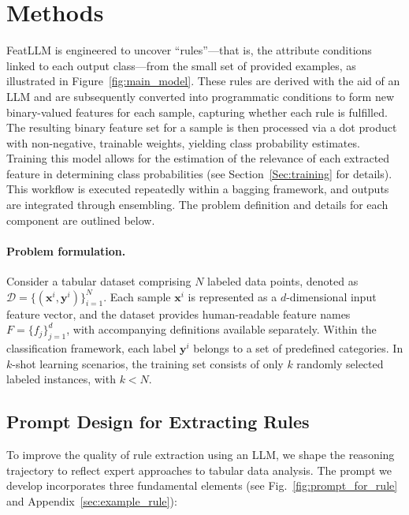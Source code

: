\section{Methods}
\textsf{FeatLLM} is engineered to uncover “rules”—that is, the attribute conditions linked to each output class—from the small set of provided examples, as illustrated in Figure~\ref{fig:main_model}. These rules are derived with the aid of an LLM and are subsequently converted into programmatic conditions to form new binary-valued features for each sample, capturing whether each rule is fulfilled. The resulting binary feature set for a sample is then processed via a dot product with non-negative, trainable weights, yielding class probability estimates. Training this model allows for the estimation of the relevance of each extracted feature in determining class probabilities (see Section~\ref{Sec:training} for details). This workflow is executed repeatedly within a bagging framework, and outputs are integrated through ensembling. The problem definition and details for each component are outlined below.

\vspace*{-0.12in}
\paragraph{Problem formulation.} Consider a tabular dataset comprising $N$ labeled data points, denoted as $\mathcal{D} = \{(\mathbf{x}^i, \mathbf{y}^i)\}_{i=1}^{N}$. Each sample $\mathbf{x}^i$ is represented as a $d$-dimensional input feature vector, and the dataset provides human-readable feature names $F = \{f_j\}_{j=1}^{d}$, with accompanying definitions available separately. Within the classification framework, each label $\mathbf{y}^i$ belongs to a set of predefined categories. In $k$-shot learning scenarios, the training set consists of only $k$ randomly selected labeled instances, with $k < N$.

\subsection{Prompt Design for Extracting Rules}
\label{Sec:prompt_design}
To improve the quality of rule extraction using an LLM, we shape the reasoning trajectory to reflect expert approaches to tabular data analysis. The prompt we develop incorporates three fundamental elements (see Fig.~\ref{fig:prompt_for_rule} and Appendix~\ref{sec:example_rule}):

\vspace*{-0.12in}

